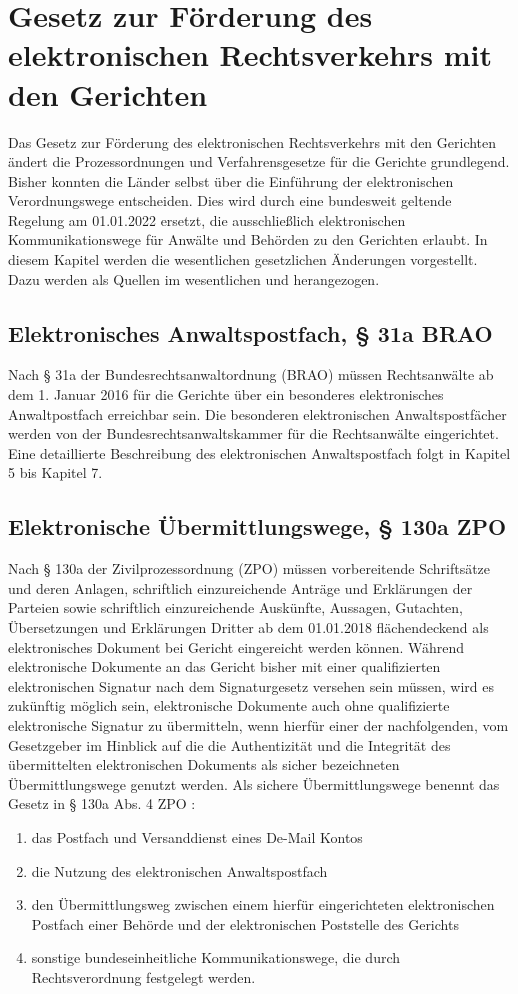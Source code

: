 \section{Gesetz zur Förderung des elektronischen Rechtsverkehrs mit den Gerichten}
Das Gesetz zur Förderung des elektronischen Rechtsverkehrs mit den Gerichten ändert die Prozessordnungen und Verfahrensgesetze für die Gerichte grundlegend. Bisher konnten die Länder selbst über die Einführung der elektronischen Verordnungswege entscheiden. Dies wird durch eine bundesweit geltende Regelung am 01.01.2022 ersetzt, die ausschließlich elektronischen Kommunikationswege für Anwälte und Behörden zu den Gerichten erlaubt. In diesem Kapitel werden die wesentlichen gesetzlichen Änderungen vorgestellt. Dazu werden als Quellen im wesentlichen \citeauthor{Gesetzfoerderungrechtsverkehr} und \citeauthor{carstens2015grundlagen} herangezogen.
\subsection*{Elektronisches Anwaltspostfach, § 31a BRAO}
Nach § 31a der Bundesrechtsanwaltordnung (BRAO) müssen Rechtsanwälte ab dem 1. Januar 2016 für die Gerichte über ein besonderes elektronisches Anwaltpostfach erreichbar sein. Die besonderen elektronischen Anwaltspostfächer werden von der Bundesrechtsanwaltskammer für die Rechtsanwälte eingerichtet. Eine detaillierte Beschreibung des elektronischen Anwaltspostfach folgt in Kapitel 5 bis Kapitel 7.
\subsection*{Elektronische Übermittlungswege, § 130a ZPO}
Nach § 130a der Zivilprozessordnung (ZPO) müssen vorbereitende Schriftsätze und deren Anlagen, schriftlich einzureichende Anträge und Erklärungen der Parteien sowie schriftlich einzureichende Auskünfte, Aussagen, Gutachten, Übersetzungen und Erklärungen Dritter ab dem 01.01.2018 flächendeckend als elektronisches Dokument bei Gericht eingereicht werden können. Während elektronische Dokumente an das Gericht bisher mit einer qualifizierten elektronischen Signatur nach dem Signaturgesetz versehen sein müssen, wird es zukünftig möglich sein, elektronische Dokumente auch ohne qualifizierte elektronische Signatur zu übermitteln, wenn hierfür einer der nachfolgenden, vom Gesetzgeber im Hinblick auf die die Authentizität und die Integrität des übermittelten elektronischen Dokuments als sicher bezeichneten Übermittlungswege genutzt werden. Als sichere Übermittlungswege benennt das Gesetz in § 130a Abs. 4 ZPO :
\begin{enumerate}
\item das Postfach und Versanddienst eines De-Mail Kontos
\item die Nutzung des elektronischen Anwaltspostfach 
\item den Übermittlungsweg zwischen einem hierfür eingerichteten elektronischen Postfach einer Behörde und der elektronischen Poststelle des Gerichts 
\item sonstige bundeseinheitliche Kommunikationswege, die durch Rechtsverordnung festgelegt werden.
\end{enumerate} 
